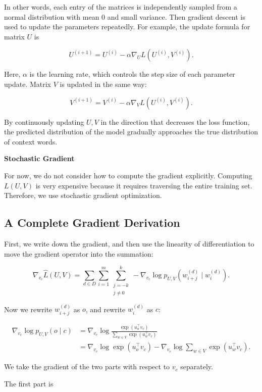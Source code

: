 \documentclass[
  a4paper,
  10pt]{article}
\begin{document}
In other words, each entry of the matrices is independently sampled from
a normal distribution with mean \(0\) and small variance. Then gradient
descent is used to update the parameters repeatedly. For example, the
update formula for matrix \(U\) is

\[
U^{(i+1)}=
U^{(i)}-
\alpha\nabla_U L\left(U^{(i)},V^{(i)}\right).
\]

Here, \(\alpha\) is the learning rate, which controls the step size of
each parameter update. Matrix \(V\) is updated in the same way:

\[
V^{(i+1)}=
V^{(i)}-
\alpha\nabla_V L\left(U^{(i)},V^{(i)}\right).
\]

By continuously updating \(U,V\) in the direction that decreases the
loss function, the predicted distribution of the model gradually
approaches the true distribution of context words.

\textbf{Stochastic Gradient}

For now, we do not consider how to compute the gradient explicitly.
Computing \(L(U,V)\) is very expensive because it requires traversing
the entire training set. Therefore, we use stochastic gradient
optimization.

\subsection{A Complete Gradient
Derivation}\label{a-complete-gradient-derivation}

First, we write down the gradient, and then use the linearity of
differentiation to move the gradient operator into the summation:

\[
\nabla_{v_c}\widehat L(U,V)=
\sum_{d\in D}
\sum_{i=1}^{m}
\sum_{\substack{j=-k\\j\ne 0}}^{k}
-\nabla_{v_c}
\log p_{U,V}
\left(
w_{i+j}^{(d)}
\mid
w_i^{(d)}
\right).
\]

Now we rewrite \(w_{i+j}^{(d)}\) as \(o\), and rewrite \(w_i^{(d)}\) as
\(c\):

\[
\begin{aligned}
\nabla_{v_c}\log p_{U,V}(o\mid c)
&=
\nabla_{v_c}\log
\frac{\exp(u_o^\top v_c)}
{\sum_{w\in V}\exp(u_w^\top v_c)} \\
&=
\nabla_{v_c}\log\exp(u_o^\top v_c)
-
\nabla_{v_c}\log
\sum_{w\in V}\exp(u_w^\top v_c).
\end{aligned}
\]

We take the gradient of the two parts with respect to \(v_c\)
separately.

The first part is
\end{document}
